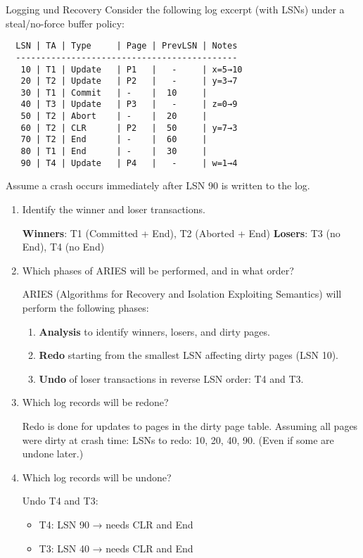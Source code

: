 \documentclass{article}
\begin{document}
\begin{exercise}{Logging und Recovery}
  Consider the following log excerpt (with LSNs) under a steal/no-force buffer policy:

  \begin{verbatim}
  LSN | TA | Type     | Page | PrevLSN | Notes
  --------------------------------------------
   10 | T1 | Update   | P1   |   -     | x=5→10
   20 | T2 | Update   | P2   |   -     | y=3→7
   30 | T1 | Commit   | -    |  10     |
   40 | T3 | Update   | P3   |   -     | z=0→9
   50 | T2 | Abort    | -    |  20     |
   60 | T2 | CLR      | P2   |  50     | y=7→3
   70 | T2 | End      | -    |  60     |
   80 | T1 | End      | -    |  30     |
   90 | T4 | Update   | P4   |   -     | w=1→4
  \end{verbatim}

  Assume a crash occurs immediately after LSN 90 is written to the log.

  \begin{enumerate}
    \item Identify the winner and loser transactions. \begin{solution}
      \textbf{Winners}: T1 (Committed + End), T2 (Aborted + End)  
      \textbf{Losers}: T3 (no End), T4 (no End)
    \end{solution}

    \item Which phases of ARIES will be performed, and in what order? \begin{solution}
      ARIES (Algorithms for Recovery and Isolation Exploiting Semantics) will perform the following phases:
      \begin{enumerate}
        \item \textbf{Analysis} to identify winners, losers, and dirty pages.
        \item \textbf{Redo} starting from the smallest LSN affecting dirty pages (LSN 10).
        \item \textbf{Undo} of loser transactions in reverse LSN order: T4 and T3.
      \end{enumerate}
    \end{solution}

    \item Which log records will be redone? \begin{solution}
      Redo is done for updates to pages in the dirty page table. Assuming all pages were dirty at crash time:
      LSNs to redo: 10, 20, 40, 90.
      (Even if some are undone later.)
    \end{solution}

    \item Which log records will be undone? \begin{solution}
      Undo T4 and T3:
      \begin{itemize}
        \item T4: LSN 90 → needs CLR and End
        \item T3: LSN 40 → needs CLR and End
      \end{itemize}
    \end{solution}
  \end{enumerate}
\end{exercise}
\end{document}
